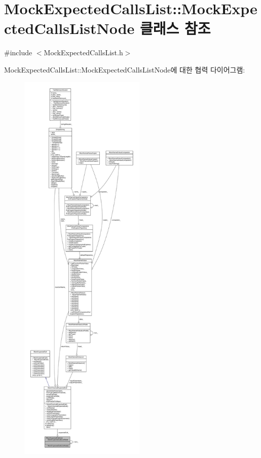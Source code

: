 \hypertarget{class_mock_expected_calls_list_1_1_mock_expected_calls_list_node}{}\section{Mock\+Expected\+Calls\+List\+:\+:Mock\+Expected\+Calls\+List\+Node 클래스 참조}
\label{class_mock_expected_calls_list_1_1_mock_expected_calls_list_node}


{\ttfamily \#include $<$Mock\+Expected\+Calls\+List.\+h$>$}



Mock\+Expected\+Calls\+List\+:\+:Mock\+Expected\+Calls\+List\+Node에 대한 협력 다이어그램\+:
\nopagebreak
\begin{figure}[H]
\begin{center}
\leavevmode
\includegraphics[height=550pt]{class_mock_expected_calls_list_1_1_mock_expected_calls_list_node__coll__graph}
\end{center}
\end{figure}
